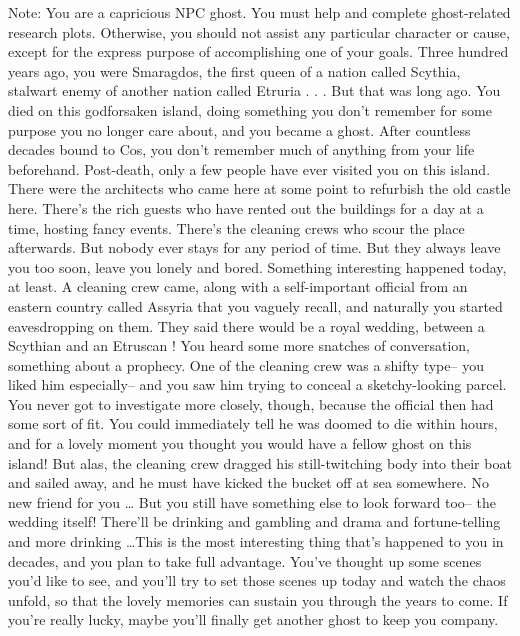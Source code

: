 \documentclass[char]{Kos}
\begin{document}
\name{\cGhost{}}

	Note: You are a capricious NPC ghost. You must help \cAnarchist{} and \cButler{} complete ghost-related research plots. Otherwise, you should not assist any particular character or cause, except for the express purpose of accomplishing one of your goals.
	Three hundred years ago, you were Smaragdos, the first queen of a nation called Scythia, stalwart enemy of another nation called Etruria . . . But that was long ago. You died on this godforsaken island, doing something you don't remember for some purpose you no longer care about, and you became a ghost. After countless decades bound to Cos, you don't remember much of anything from your life beforehand.
	 Post-death, only a few people have ever visited you on this island. There were the architects who came here at some point to refurbish the old castle here. There's the rich guests who have rented out the buildings for a day at a time, hosting fancy events. There's the cleaning crews who scour the place afterwards. But nobody ever stays for any period of time. But they always leave you too soon, leave you lonely and bored.
	 Something interesting happened today, at least. A cleaning crew came, along with a self-important official from an eastern country called Assyria that you vaguely recall, and naturally you started eavesdropping on them. They said there would be a royal wedding, between a Scythian \cBride{\prince} and an Etruscan \cGroom{\prince}! You heard some more snatches of conversation, something about a prophecy. One of the cleaning crew was a shifty type-- you liked him especially-- and you saw him trying to conceal a sketchy-looking parcel. You never got to investigate more closely, though, because the official then had some sort of fit. You could immediately tell he was doomed to die within hours, and for a lovely moment you thought you would have a fellow ghost on this island! But alas, the cleaning crew dragged his still-twitching body into their boat and sailed away, and he must have kicked the bucket off at sea somewhere. No new friend for you \ldots
	 But you still have something else to look forward too-- the wedding itself! There'll be drinking and gambling and drama and fortune-telling and more drinking \ldots This is the most interesting thing that's happened to you in decades, and you plan to take full advantage. You've thought up some scenes you'd like to see, and you'll try to set those scenes up today and watch the chaos unfold, so that the lovely memories can sustain you through the years to come.
	 If you're really lucky, maybe you'll finally get another ghost to keep you company.
\end{document}

